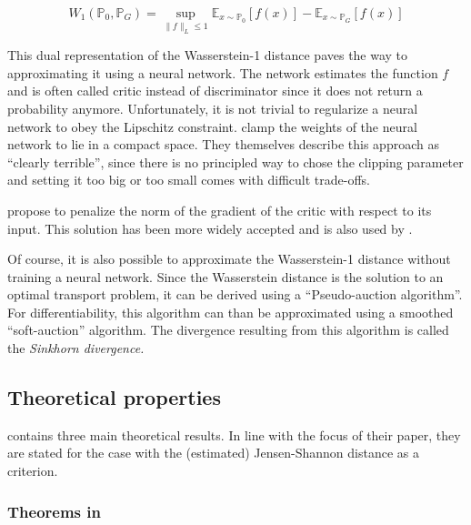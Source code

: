 \begin{theorem}
    \begin{equation}
        W_{1}\left(\mathbb{P}_0, \mathbb{P}_G\right)=\sup _{\|f\|_L \leq 1} \mathbb{E}_{x \sim \mathbb{P}_0}[f(x)]-\mathbb{E}_{x \sim \mathbb{P}_G}[f(x)]
    \end{equation}
\end{theorem}

This dual representation of the Wasserstein-1 distance paves the way to approximating it using a neural network.
The network estimates the function $f$ and is often called critic instead of discriminator since it does not return a probability anymore.
Unfortunately, it is not trivial to regularize a neural network to obey the Lipschitz constraint.
\Textcite{arjovsky2017wassersteingan} clamp the weights of the neural network to lie in a compact space.
They themselves describe this approach as ``clearly terrible'', since there is no principled way to chose the clipping parameter and setting it too big or too small comes with difficult trade-offs. %

\Textcite{gulrajani2017improvedtrainingwassersteingans} propose to penalize the norm of the gradient of the critic with respect to its input.
This solution has been more widely accepted and is also used by \textcite{athey2021using}.

Of course, it is also possible to approximate the Wasserstein-1 distance without training a neural network.
Since the Wasserstein distance is the solution to an optimal transport problem, it can be derived using a ``Pseudo-auction algorithm''.
For differentiability, this algorithm can than be approximated using a smoothed ``soft-auction'' algorithm.
The divergence resulting from this algorithm is called the \textit{Sinkhorn divergence.} %

\subsection{Theoretical properties}
\label{sec:theory}

\textcite{kaji2023adversarial} contains three main theoretical results.
In line with the focus of their paper, they are stated for the case with the (estimated) Jensen-Shannon distance as a criterion.

\subsubsection{Theorems in \cite{goodfellow2014generative}}



